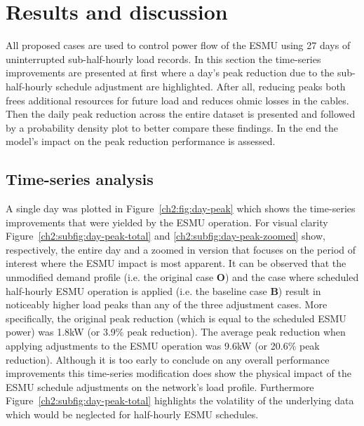 \section{Results and discussion}
\label{ch2:sec:results}

All proposed cases are used to control power flow of the ESMU using 27 days of uninterrupted sub-half-hourly load records.
In this section the time-series improvements are presented at first where a day's peak reduction due to the sub-half-hourly schedule adjustment are highlighted.
After all, reducing peaks both frees additional resources for future load and reduces ohmic losses in the cables.
Then the daily peak reduction across the entire dataset is presented and followed by a probability density plot to better compare these findings.
In the end the model's impact on the peak reduction performance is assessed.

\subsection{Time-series analysis}



A single day was plotted in Figure~\ref{ch2:fig:day-peak} which shows the time-series improvements that were yielded by the ESMU operation.
For visual clarity Figure~\ref{ch2:subfig:day-peak-total} and \ref{ch2:subfig:day-peak-zoomed} show, respectively, the entire day and a zoomed in version that focuses on the period of interest where the ESMU impact is most apparent.
It can be observed that the unmodified demand profile (i.e. the original case  \textbf{O}) and the case where scheduled half-hourly ESMU operation is applied (i.e. the  baseline case \textbf{B}) result in noticeably higher load peaks than any of the three adjustment cases.
More specifically, the original peak reduction (which is equal to the scheduled ESMU power) was 1.8kW (or 3.9\% peak reduction).
The average peak reduction when applying adjustments to the ESMU operation was 9.6kW (or 20.6\% peak reduction).
Although it is too early to conclude on any overall performance improvements this time-series modification does show the physical impact of the ESMU schedule adjustments on the network's load profile.
Furthermore Figure~\ref{ch2:subfig:day-peak-total} highlights the volatility of the underlying data which would be neglected for half-hourly ESMU schedules.

